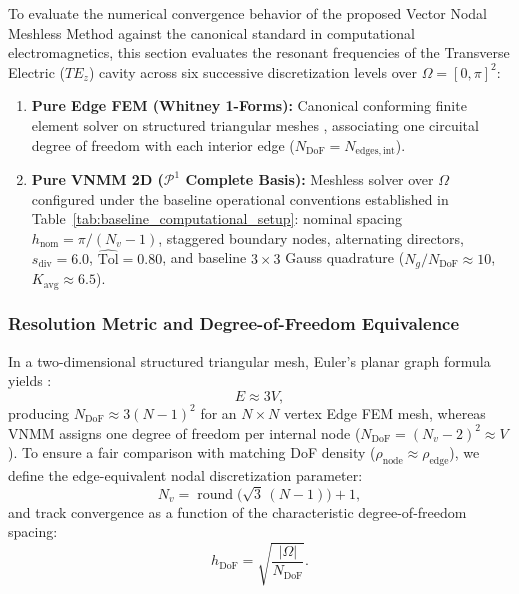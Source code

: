 \documentclass[preprint,12pt]{elsarticle}
\begin{document}
To evaluate the numerical convergence behavior of the proposed Vector Nodal Meshless Method against the canonical standard in computational electromagnetics, this section evaluates the resonant frequencies of the Transverse Electric ($TE_z$) cavity across six successive discretization levels over $\Omega = [0, \pi]^2$:
\begin{enumerate}
    \item \textbf{Pure Edge FEM (Whitney 1-Forms):} Canonical conforming finite element solver on structured triangular meshes \cite{monk2003finite}, associating one circuital degree of freedom with each interior edge ($N_{\mathrm{DoF}} = N_{\mathrm{edges, int}}$).
    \item \textbf{Pure VNMM 2D ($\mathcal{P}^1$ Complete Basis):} Meshless solver over $\Omega$ configured under the baseline operational conventions established in Table~\ref{tab:baseline_computational_setup}: nominal spacing $h_{\mathrm{nom}} = \pi / (N_v - 1)$, staggered boundary nodes, alternating directors, $s_{\mathrm{div}} = 6.0$, $\widehat{\mathrm{Tol}} = 0.80$, and baseline $3 \times 3$ Gauss quadrature ($N_g / N_{\mathrm{DoF}} \approx 10$, $K_{\mathrm{avg}} \approx 6.5$).
\end{enumerate}

\subsubsection{Resolution Metric and Degree-of-Freedom Equivalence}
In a two-dimensional structured triangular mesh, Euler's planar graph formula yields \cite{deberg2008computational}:
\begin{equation}
    E \approx 3V,
    \label{eq:euler_edge_vertex}
\end{equation}
producing $N_{\mathrm{DoF}} \approx 3(N-1)^2$ for an $N \times N$ vertex Edge FEM mesh, whereas VNMM assigns one degree of freedom per internal node ($N_{\mathrm{DoF}} = (N_v - 2)^2 \approx V$). To ensure a fair comparison with matching DoF density ($\rho_{\mathrm{node}} \approx \rho_{\mathrm{edge}}$), we define the edge-equivalent nodal discretization parameter:
\begin{equation}
    N_v = \operatorname{round}\bigl(\sqrt{3}\,(N - 1)\bigr) + 1,
    \label{eq:edge_equivalent_nv}
\end{equation}
and track convergence as a function of the characteristic degree-of-freedom spacing:
\begin{equation}
    h_{\mathrm{DoF}} = \sqrt{\frac{|\Omega|}{N_{\mathrm{DoF}}}}.
    \label{eq:h_dof_definition}
\end{equation}
\end{document}
